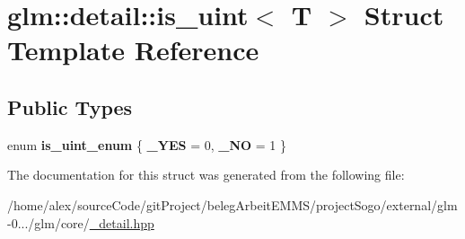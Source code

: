 \hypertarget{structglm_1_1detail_1_1is__uint}{\section{glm\-:\-:detail\-:\-:is\-\_\-uint$<$ T $>$ Struct Template Reference}
\label{structglm_1_1detail_1_1is__uint}
}
\subsection*{Public Types}
\begin{DoxyCompactItemize}
\item 
enum {\bfseries is\-\_\-uint\-\_\-enum} \{ {\bfseries \-\_\-\-Y\-E\-S} = 0, 
{\bfseries \-\_\-\-N\-O} = 1
 \}
\end{DoxyCompactItemize}


The documentation for this struct was generated from the following file\-:\begin{DoxyCompactItemize}
\item 
/home/alex/source\-Code/git\-Project/beleg\-Arbeit\-E\-M\-M\-S/project\-Sogo/external/glm-\/0.../glm/core/\hyperlink{__detail_8hpp}{\-\_\-detail.\-hpp}\end{DoxyCompactItemize}
